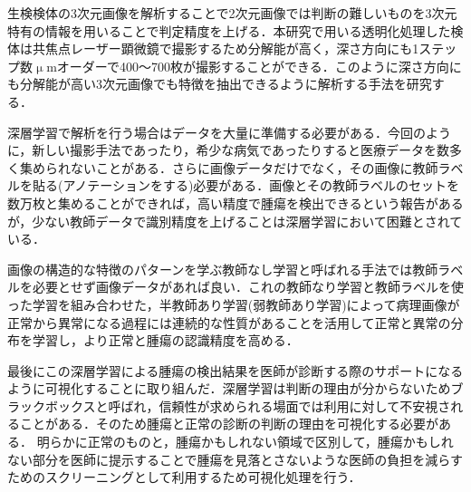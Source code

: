 生検検体の3次元画像を解析することで2次元画像では判断の難しいものを3次元特有の情報を用いることで判定精度を上げる．本研究で用いる透明化処理した検体は共焦点レーザー顕微鏡で撮影するため分解能が高く，深さ方向にも1ステップ数$\upmu$mオーダーで400〜700枚が撮影することができる．このように深さ方向にも分解能が高い3次元画像でも特徴を抽出できるように解析する手法を研究する．

深層学習で解析を行う場合はデータを大量に準備する必要がある．今回のように，新しい撮影手法であったり，希少な病気であったりすると医療データを数多く集められないことがある．さらに画像データだけでなく，その画像に教師ラベルを貼る(アノテーションをする)必要がある．画像とその教師ラベルのセットを数万枚と集めることができれば，高い精度で腫瘍を検出できるという報告があるが\cite{esteva2017dermatologist}，少ない教師データで識別精度を上げることは深層学習において困難とされている．

画像の構造的な特徴のパターンを学ぶ教師なし学習と呼ばれる手法では教師ラベルを必要とせず画像データがあれば良い．これの教師なり学習と教師ラベルを使った学習を組み合わせた，半教師あり学習(弱教師あり学習)によって病理画像が正常から異常になる過程には連続的な性質があることを活用して正常と異常の分布を学習し，より正常と腫瘍の認識精度を高める．

最後にこの深層学習による腫瘍の検出結果を医師が診断する際のサポートになるように可視化することに取り組んだ．深層学習は判断の理由が分からないためブラックボックスと呼ばれ，信頼性が求められる場面では利用に対して不安視されることがある．そのため腫瘍と正常の診断の判断の理由を可視化する必要がある．
明らかに正常のものと，腫瘍かもしれない領域で区別して，腫瘍かもしれない部分を医師に提示することで腫瘍を見落とさないような医師の負担を減らすためのスクリーニングとして利用するため可視化処理を行う．

